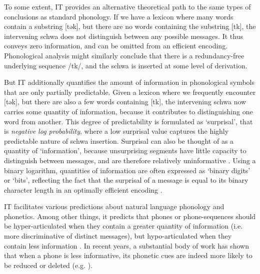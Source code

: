\documentclass[output=paper,colorlinks,citecolor=brown]{langscibook}
\begin{document}
To some extent, IT provides an alternative theoretical path to the same types of conclusions as standard phonology. If we have a lexicon where many words contain a substring [tək], but there are no words containing the substring [tk], the intervening schwa does not distinguish between any possible messages. It thus conveys zero information, and can be omitted from an efficient encoding. Phonological analysis might similarly conclude that there is a redundancy-free underlying sequence /tk/, and the schwa is inserted at some level of derivation.

But IT additionally quantifies the amount of information in phonological symbols that are only partially predictable. Given a lexicon where we frequently encounter [tək], but there are also a few words containing [tk], the intervening schwa now carries some quantity of information, because it contributes to distinguishing one word from another. This degree of predictability is formulated as `surprisal', that is \emph{negative log probability}, where a low surprisal value captures the highly predictable nature of schwa insertion. Surprisal can also be thought of as a quantity of `information', because unsurprising segments have little capacity to distinguish between messages, and are therefore relatively uninformative \citep{Shannon1951}. Using a binary logarithm, quantities of information are often expressed as ‘binary digits’ or ‘bits’, reflecting the fact that the surprisal of a message is equal to its binary character length in an optimally efficient encoding \citep{Shannon1948}. 

IT facilitates various predictions about natural language phonology and phonetics. Among other things, it predicts that phones or phone-sequences should be hyper-articulated when they contain a greater quantity of information (i.e. more discriminative of distinct messages), but hypo-articulated when they contain less information \citep{Lindblom1990}. In recent years, a substantial body of work has shown that when a phone is less informative, its phonetic cues are indeed more likely to be reduced or deleted (e.g. \citealt{vanSonvanSanten2005,Hall2009,CohenPriva2015,CohenPriva2017,ShawKawahara2017,HallEtAl2018}).
\end{document}
